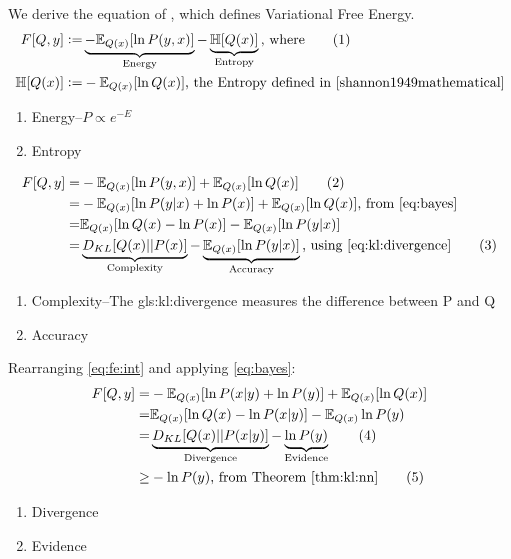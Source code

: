\documentclass[]{article}
\newcommand{\defeq}{\vcentcolon=}
\newcommand\numberthis{\addtocounter{equation}{1}\tag{\theequation}}
\begin{document}
We derive the equation of \cite[Section 2.5]{parr2022Active}, which defines Variational Free Energy. 
\begin{align*}
	F[Q,y] \defeq&\underbrace{ -\mathbb{E}_{Q(x)}[\ln{P(y,x)}] }_\text{Energy}- \underbrace{\mathbb{H}[Q(x)]}_\text{Entropy} \text{, where} \numberthis \label{eq:fe}\\
	\mathbb{H}[Q(x)] \defeq& - \mathbb{E}_{Q(x)} [\ln{Q(x)}] \text{, the Entropy defined in \cite{shannon1949mathematical}}
\end{align*}
\begin{enumerate}
	\item Energy--$P \propto e^{-E}$
	\item Entropy
\end{enumerate}
\begin{align*}
	F[Q,y] = & -\mathbb{E}_{Q(x)}[\ln{P(y,x)}] + \mathbb{E}_{Q(x)}[\ln{Q(x)}]\numberthis \label{eq:fe:int}\\
	=&-\mathbb{E}_{Q(x)}[\ln{P(y\vert x)} + \ln{P(x)}] + \mathbb{E}_{Q(x)}[\ln{Q(x)}] \text{, from \eqref{eq:bayes}} \\
	=&\mathbb{E}_{Q(x)}[\ln{Q(x)}-\ln{P(x)}] -\mathbb{E}_{Q(x)}[\ln{P(y\vert x)}]\\
	=&\underbrace{ D_{KL}[Q(x)\lvert\rvert P(x)]}_\text{Complexity} - \underbrace{\mathbb{E}_{Q(x)}[\ln{P(y\vert x)}]}_\text{Accuracy}\text{, using \eqref{eq:kl:divergence}} \numberthis \label{eq:fe:complexity:accuracy}
\end{align*}
\begin{enumerate}
	\item Complexity--The \gls{gls:kl:divergence} measures the difference between P and Q
	\item Accuracy
\end{enumerate}
Rearranging \eqref{eq:fe:int} and applying  \eqref{eq:bayes}:
\begin{align*}
	F[Q,y] =& -\mathbb{E}_{Q(x)}[\ln{P(x\vert y)} + \ln{P(y)}] + \mathbb{E}_{Q(x)}[\ln{Q(x)}]\\
	=& \mathbb{E}_{Q(x)}[\ln{Q(x)}-\ln{P(x\vert y)]} - \mathbb{E}_{Q(x)}\ln{P(y)}\\
	=&\underbrace{D_{KL}[Q(x)\lvert\rvert P(x\vert y)]}_\text{Divergence} - \underbrace{\ln{P(y)}}_\text{Evidence} \numberthis \label{eq:fe:divergence:evidence}\\
	\ge& -\ln{P(y)} \text{, from Theorem \ref{thm:kl:nn}} \numberthis \label{eq:evidence:bound}
\end{align*}

\begin{enumerate}
	\item Divergence
	\item Evidence
\end{enumerate}
\end{document}
